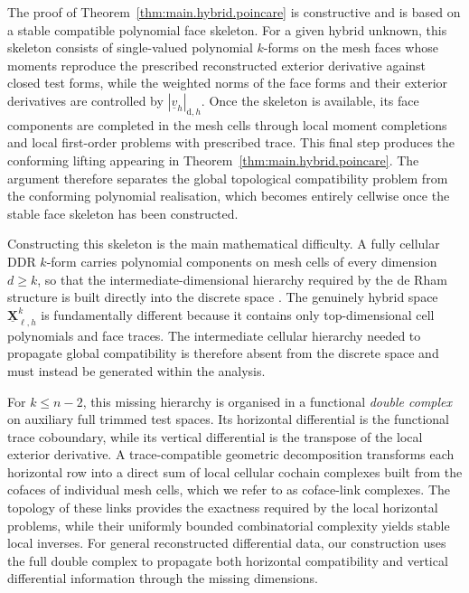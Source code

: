 \documentclass[a4paper,11pt]{article}
\theoremstyle{definition}
\newcommand{\DIFF}{\mathrm{d}}
\newcommand{\uXh}[1]{\underline{\boldsymbol{X}}_{\ell,h}^{#1}}
\begin{document}
The proof of Theorem~\ref{thm:main.hybrid.poincare} is constructive and is based on a stable compatible polynomial face skeleton.
For a given hybrid unknown, this skeleton consists of single-valued polynomial $k$-forms on the mesh faces whose moments reproduce the prescribed reconstructed exterior derivative against closed test forms, while the weighted norms of the face forms and their exterior derivatives are controlled by $|\underline v_h|_{\DIFF,h}$.
Once the skeleton is available, its face components are completed in the mesh cells through local moment completions and local first-order problems with prescribed trace.
This final step produces the conforming lifting appearing in Theorem~\ref{thm:main.hybrid.poincare}.
The argument therefore separates the global topological compatibility problem from the conforming polynomial realisation, which becomes entirely cellwise once the stable face skeleton has been constructed.

Constructing this skeleton is the main mathematical difficulty.
A fully cellular DDR $k$-form carries polynomial components on mesh cells of every dimension $d\geq k$, so that the intermediate-dimensional hierarchy required by the de Rham structure is built directly into the discrete space \cite{Di-Pietro.Droniou.Pitassi:25}.
The genuinely hybrid space $\uXh{k}$ is fundamentally different because it contains only top-dimensional cell polynomials and face traces.
The intermediate cellular hierarchy needed to propagate global compatibility is therefore absent from the discrete space and must instead be generated within the analysis.

For $k\leq n-2$, this missing hierarchy is organised in a functional \emph{double complex} on auxiliary full trimmed test spaces.
Its horizontal differential is the functional trace coboundary, while its vertical differential is the transpose of the local exterior derivative.
A trace-compatible geometric decomposition transforms each horizontal row into a direct sum of local cellular cochain complexes built from the cofaces of individual mesh cells, which we refer to as coface-link complexes.
The topology of these links provides the exactness required by the local horizontal problems, while their uniformly bounded combinatorial complexity yields stable local inverses.
For general reconstructed differential data, our construction uses the full double complex to propagate both horizontal compatibility and vertical differential information through the missing dimensions.
\end{document}
